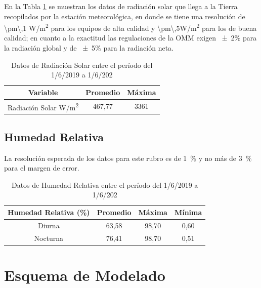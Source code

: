 En la Tabla \ref{radiacion_met} se muestran los datos de radiación solar que llega a la Tierra recopilados por la estación meteorológica, en donde se tiene una resolución de \num{\pm\,1} \si{\watt/\square\meter} para los equipos de alta calidad y \num{\pm\,5}\si{\watt/\square\meter} para los de buena calidad; en cuanto a la exactitud las regulaciones de la OMM exigen \num{\pm2}\si{\percent} para la radiación global y de \num{\pm5}\si{\percent}  para la radiación neta. \cite{ots_manual}       

\begin{table}[H]
\centering
\caption{Datos de Radiación Solar entre el período del 1/6/2019 a 1/6/202 }
\label{radiacion_met}
\begin{tabular}{ccc}
\toprule
\textbf{Variable}     & \textbf{Promedio}          & \textbf{Máxima}          \\ \midrule
Radiación Solar \si{\watt/\square\meter} & \multicolumn{1}{c}{467,77} & \multicolumn{1}{c}{3361} \\ \bottomrule
\end{tabular}
\end{table}

\subsection{Humedad Relativa}

La resolución esperada de los datos para este rubro es de \SI{1}{\percent} y no más de \SI{3}{\percent} para el margen de error.\cite{ots_manual}

\begin{table}[H]
\centering
\caption{Datos de Humedad Relativa entre el período del 1/6/2019 a 1/6/202 }
\label{humedad_met}
\begin{tabular}{cccc}
\toprule
\textbf{Humedad Relativa (\si{\percent})} & \multicolumn{1}{l}{\textbf{Promedio}} & \multicolumn{1}{l}{\textbf{Máxima}} & \textbf{Mínima} \\ \midrule
Diurna                         & 63,58                                 & 98,70                               & 0,60            \\
Nocturna                       & 76,41                                 & 98,70                               & 0,51            \\ \bottomrule
\end{tabular}
\end{table}

\section{Esquema de Modelado}

